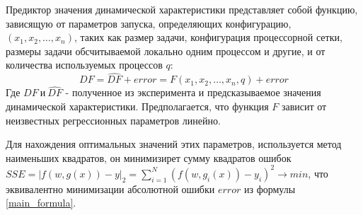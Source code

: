 	Предиктор значения динамической характеристики представляет собой функцию, зависящую от параметров запуска, определяющих конфигурацию, \((x_1, x_2, \ldots, x_n)\), таких как размер задачи, конфигурация процессорной сетки, размеры задачи обсчитываемой локально одним процессом и другие, и от количества используемых процессов \(q\):
	\begin{equation}\label{main_formula}
	DF = \hat{DF} + error = F(x_1, x_2, \ldots, x_n, q) + error
	\end{equation}
	Где \(DF\ и\ \hat{DF}\) - полученное из эксперимента и предсказываемое значения динамической характеристики. Предполагается, что функция \(F\) зависит от неизвестных регрессионных параметров линейно.


	

	Для нахождения оптимальных значений этих параметров, используется метод наименьших квадратов, он минимизирет сумму квадратов ошибок \(SSE = |f(w, g(x)) - y|_2 = \sum_{i = 1}^{N}{(f(w, g_i(x)) - y_i)^2 \rightarrow min}\), что эквивалентно минимизации абсолютной ошибки \(error\) из формулы \eqref{main_formula}.
	
